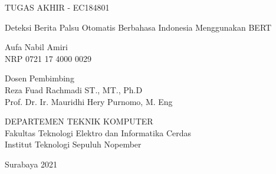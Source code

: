 TUGAS AKHIR - EC184801

\vspace{6ex}

\begin{large}
  Deteksi Berita Palsu Otomatis Berbahasa Indonesia Menggunakan BERT
\end{large}

\vspace{4ex}

Aufa Nabil Amiri \\
NRP 0721 17 4000 0029

\vspace{2ex}

Dosen Pembimbing \\
Reza Fuad Rachmadi ST., MT., Ph.D \\
Prof. Dr. Ir. Mauridhi Hery Purnomo, M. Eng

\vspace{6ex}

DEPARTEMEN TEKNIK KOMPUTER \\
Fakultas Teknologi Elektro dan Informatika Cerdas \\
Institut Teknologi Sepuluh Nopember

Surabaya 2021
